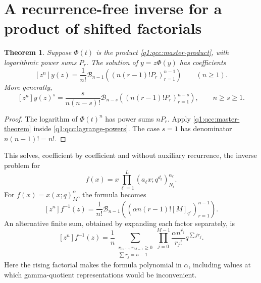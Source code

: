 \documentclass[11pt,a4paper,oneside,openany]{book}
\newtheorem{theorem}{Theorem}[chapter]
\theoremstyle{definition}
\theoremstyle{remark}
\newcommand{\Y}[1]{\mathcal B_{#1}}
\newcommand{\rising}[2]{#1^{\overline{#2}}}
\begin{document}
\section{A recurrence-free inverse for a product of shifted factorials}
\begin{theorem}\label{q1:qcc:inverse-product}
Suppose \(\Phi(t)\) is the product \eqref{q1:qcc:master-product}, with logarithmic
power sums \(P_r\). The solution of \(y=z\Phi(y)\) has coefficients
\begin{equation}\label{q1:qcc:inverse-product-formula}
 [z^n]y(z)=\frac1{n!}\Y{n-1}
       \left(\left(n(r-1)!P_r\right)_{r=1}^{n-1}\right)\qquad(n\ge1).
\end{equation}
More generally,
\begin{equation}\label{q1:qcc:inverse-product-powers}
 [z^n]y(z)^s=\frac{s}{n(n-s)!}\Y{n-s}
       \left(\left(n(r-1)!P_r\right)_{r=1}^{n-s}\right),\qquad n\ge s\ge1.
\end{equation}
\end{theorem}
\begin{proof}
The logarithm of \(\Phi(t)^n\) has power sums \(nP_r\).
Apply \cref{q1:qcc:master-theorem} inside \eqref{q1:qcc:lagrange-powers}.
The case \(s=1\) has denominator \(n(n-1)!=n!\).
\end{proof}
This solves, coefficient by coefficient and without auxiliary recurrence, the
inverse problem for
\[
 f(x)=x\prod_{\ell=1}^L(a_\ell x;q^{d_\ell})_{N_\ell}^{\alpha_\ell}.
\]
For \(f(x)=x(x;q)_M^\alpha\), the formula becomes
\begin{equation}\label{q1:qcc:simple-inverse}
 [z^n]f^{-1}(z)=\frac1{n!}\Y{n-1}
   \left(\left(\alpha n(r-1)![M]_{q^r}\right)_{r=1}^{n-1}\right).
\end{equation}
An alternative finite sum, obtained by expanding each factor separately, is
\begin{equation}\label{q1:qcc:simple-inverse-multisum}
 [z^n]f^{-1}(z)=\frac1n
 \sum_{\substack{r_0,\ldots,r_{M-1}\ge0\\\sum r_j=n-1}}
 \prod_{j=0}^{M-1}\frac{\rising{\alpha n}{r_j}}{r_j!}
 q^{\sum j r_j}.
\end{equation}
Here the rising factorial makes the formula polynomial in \(\alpha\), including
values at which gamma-quotient representations would be inconvenient.
\end{document}
